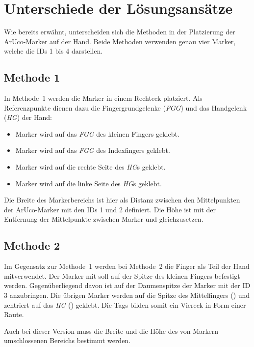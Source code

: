 \section{Unterschiede der Lösungsansätze}
\label{sec:diff_meth}

Wie bereits erwähnt, unterscheiden sich die Methoden in der Platzierung der ArUco-Marker auf der Hand.
Beide Methoden verwenden genau vier Marker, welche die IDs 1 bis 4 darstellen.

\subsection{Methode 1}
In Methode~1 werden die Marker in einem Rechteck platziert.
Als Referenzpunkte dienen dazu die Fingergrundgelenke (\textit{FGG}) und das Handgelenk (\textit{HG}) der Hand:

\begin{itemize}
    \item Marker  wird auf das \textit{FGG} des kleinen Fingers geklebt.
    \item Marker  wird auf das \textit{FGG} des Indexfingers geklebt.
    \item Marker  wird auf die rechte Seite des \textit{HG}s geklebt.
    \item Marker  wird auf die linke Seite des \textit{HG}s geklebt.
\end{itemize}

Die Breite des Markerbereichs ist hier als Distanz zwischen den Mittelpunkten der ArUco-Marker mit den IDs 1 und 2 definiert.
Die Höhe ist mit der Entfernung der Mittelpunkte zwischen Marker  und  gleichzusetzen.

\subsection{Methode 2}
Im Gegensatz zur Methode~1 werden bei Methode~2 die Finger als Teil der Hand mitverwendet.
Der Marker mit  soll auf der Spitze des kleinen Fingers befestigt werden.
Gegenüberliegend davon ist auf der Daumenspitze der Marker mit der ID 3 anzubringen.
Die übrigen Marker werden auf die Spitze des Mittelfingers () und zentriert auf das \textit{HG} () geklebt.
Die Tags bilden somit ein Viereck in Form einer Raute.

Auch bei dieser Version muss die Breite und die Höhe des von Markern umschlossenen Bereichs bestimmt werden.

